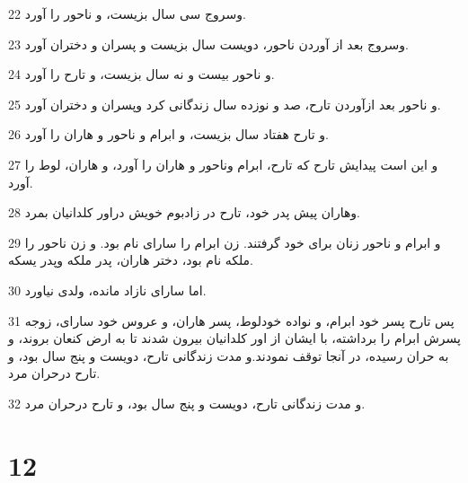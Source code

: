 \par 22 وسروج سی سال بزیست، و ناحور را آورد.
\par 23 وسروج بعد از آوردن ناحور، دویست سال بزیست و پسران و دختران آورد.
\par 24 و ناحور بیست و نه سال بزیست، و تارح را آورد.
\par 25 و ناحور بعد ازآوردن تارح، صد و نوزده سال زندگانی کرد وپسران و دختران آورد.
\par 26 و تارح هفتاد سال بزیست، و ابرام و ناحور و هاران را آورد.
\par 27 و این است پیدایش تارح که تارح، ابرام وناحور و هاران را آورد، و هاران، لوط را آورد.
\par 28 وهاران پیش پدر خود، تارح در زادبوم خویش دراور کلدانیان بمرد.
\par 29 و ابرام و ناحور زنان برای خود گرفتند. زن ابرام را سارای نام بود. و زن ناحور را ملکه نام بود، دختر هاران، پدر ملکه وپدر یسکه.
\par 30 اما سارای نازاد مانده، ولدی نیاورد.
\par 31 پس تارح پسر خود ابرام، و نواده خودلوط، پسر هاران، و عروس خود سارای، زوجه پسرش ابرام را برداشته، با ایشان از اور کلدانیان بیرون شدند تا به ارض کنعان بروند، و به حران رسیده، در آنجا توقف نمودند.و مدت زندگانی تارح، دویست و پنج سال بود، و تارح درحران مرد.
\par 32 و مدت زندگانی تارح، دویست و پنج سال بود، و تارح درحران مرد.
 
\chapter{12}

